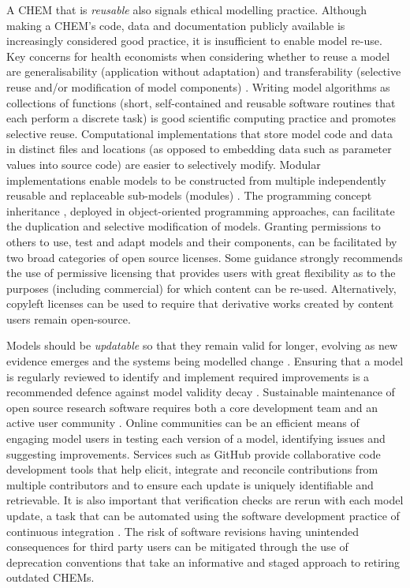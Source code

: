 \documentclass[sn-vancouver,Numbered,pdflatex]{sn-jnl}
\theoremstyle{remark}
\theoremstyle{definition}
\begin{document}
A CHEM that is \emph{reusable} also signals ethical modelling practice. Although making a CHEM's code, data and documentation publicly available is increasingly considered good practice, it is insufficient to enable model re-use. Key concerns for health economists when considering whether to reuse a model are generalisability (application without adaptation) and transferability (selective reuse and/or modification of model components) \citep{RN39}. Writing model algorithms as collections of functions (short, self-contained and reusable software routines that each perform a discrete task) is good scientific computing practice \citep{Wilson_2017} and promotes selective reuse. Computational implementations that store model code and data in distinct files and locations (as opposed to embedding data such as parameter values into source code) are easier to selectively modify. Modular implementations enable models to be constructed from multiple independently reusable and replaceable sub-models (modules) \citep{pan2021modular}. The programming concept inheritance \citep{8717448}, deployed in object-oriented programming approaches, can facilitate the duplication and selective modification of models. Granting permissions to others to use, test and adapt models and their components, can be facilitated by two broad categories of open source licenses. Some guidance strongly recommends the use of permissive licensing \citep{Wilson_2017} that provides users with great flexibility as to the purposes (including commercial) for which content can be re-used. Alternatively, copyleft licenses \citep{copyleft2022} can be used to require that derivative works created by content users remain open-source.

Models should be \emph{updatable} so that they remain valid for longer, evolving as new evidence emerges and the systems being modelled change \citep{Jenkins2021, garcia2021cost}. Ensuring that a model is regularly reviewed to identify and implement required improvements is a recommended defence against model validity decay \citep{calder2018computational}. Sustainable maintenance of open source research software requires both a core development team and an active user community \citep{info:doi/10.2196/20028}. Online communities can be an efficient means of engaging model users in testing each version of a model, identifying issues and suggesting improvements. Services such as GitHub \citep{github2007} provide collaborative code development tools \citep{MERGEL2015464} that help elicit, integrate and reconcile contributions from multiple contributors and to ensure each update is uniquely identifiable and retrievable. It is also important that verification checks are rerun with each model update, a task that can be automated using the software development practice of continuous integration \citep{CI2017}. The risk of software revisions having unintended consequences for third party users can be mitigated through the use of deprecation conventions \citep{zhou2016api} that take an informative and staged approach to retiring outdated CHEMs.
\end{document}
